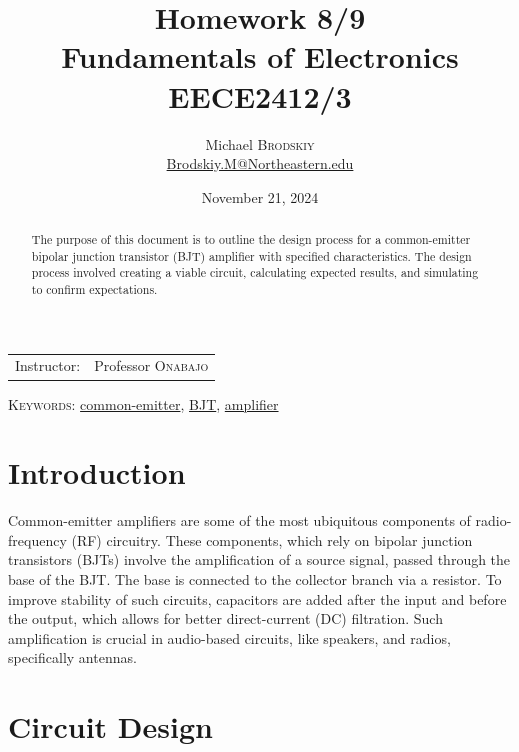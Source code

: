 \documentclass[
	letterpaper, %
	10pt, %
]{CSUniSchoolLabReport}
\title{Homework 8/9\\ Fundamentals of Electronics \\ EECE2412/3} %
\author{Michael \textsc{Brodskiy}\\ \small \href{mailto:Brodskiy.M@Northeastern.edu}{Brodskiy.M@Northeastern.edu}}
\date{November 21, 2024} %
\begin{document}
\maketitle %

\begin{center}
	\begin{tabular}{l r}
		Instructor: & Professor \textsc{Onabajo} \\ %
	\end{tabular}
\end{center}

\newpage

\begin{abstract}

  The purpose of this document is to outline the design process for a common-emitter bipolar junction transistor (BJT) amplifier with specified characteristics. The design process involved creating a viable circuit, calculating expected results, and simulating to confirm expectations.

\end{abstract}

\begin{flushleft}

  \textsc{Keywords:} \underline{common-emitter}, \underline{BJT}, \underline{amplifier} 

\end{flushleft}

\newpage

\tableofcontents
\listoffigures

\newpage

\section{Introduction}

Common-emitter amplifiers are some of the most ubiquitous components of radio-frequency (RF) circuitry. These components, which rely on bipolar junction transistors (BJTs) involve the amplification of a source signal, passed through the base of the BJT. The base is connected to the collector branch via a resistor. To improve stability of such circuits, capacitors are added after the input and before the output, which allows for better direct-current (DC) filtration. Such amplification is crucial in audio-based circuits, like speakers, and radios, specifically antennas.

\section{Circuit Design}
\end{document}
